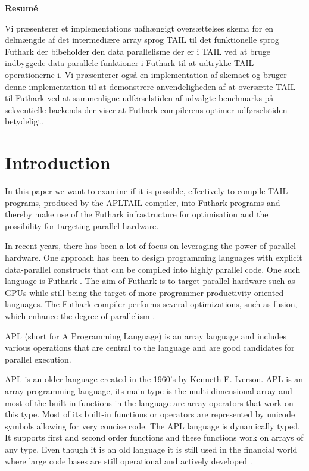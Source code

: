 \documentclass[11pt]{article}
\begin{document}
\begin{center}
\textbf{Resumé}
\end{center}
Vi præsenterer et implementations uafhængigt oversættelses skema for en delmængde af det intermediære array sprog TAIL til det funktionelle sprog Futhark der bibeholder den data parallelisme der er i TAIL ved at bruge indbyggede data parallele funktioner i Futhark til at udtrykke TAIL operationerne i. Vi præsenterer også en implementation af skemaet og bruger denne implementation til at demonstrere anvendeligheden af at oversætte TAIL til Futhark ved at sammenligne udførselstiden af udvalgte benchmarks på sekventielle backends der viser at Futhark compilerens optimer udførselstiden betydeligt.

\newpage

\tableofcontents

\newpage

\section{Introduction}
\label{intro}
In this paper we want to examine if it is possible, effectively to compile TAIL programs, produced by the APLTAIL compiler, into Futhark programs and thereby make use of the Futhark infrastructure for optimisation and the possibility for targeting parallel hardware.

In recent years, there has been a lot of focus on leveraging the power of parallel hardware. 
One approach has been to design programming languages with explicit data-parallel constructs that can be compiled 
into highly parallel code. One such language is Futhark \cite{TroelsHenriksen}. The aim of Futhark is to target parallel hardware such as 
GPUs while still being the target of more programmer-productivity oriented languages. The Futhark compiler 
performs several optimizations, such as fusion, which enhance the degree of 
parallelism \cite{T.Henriksen&C.Oancea} \cite{T2graph} \cite{Hybrid}.

APL (short for A Programming Language) \cite{APLbook} is an array language and includes various operations that are central to the language and are good candidates 
for parallel execution. 

APL is an older language created in the 1960's by Kenneth E. Iverson.
APL is an array programming language, its main type is the multi-dimensional array 
and most of the built-in functions in the language are array operators that work on this type. 
Most of its built-in functions or operators are represented by unicode symbols allowing for very concise code.
The APL language is dynamically typed. It supports first and second order functions and these functions work on arrays of any type. 
Even though it is an old language it is still used in the financial world 
where large code bases are still operational and actively developed \cite{ElsmanDybdal:Array:2014} \cite{Array:2015}.
\end{document}
